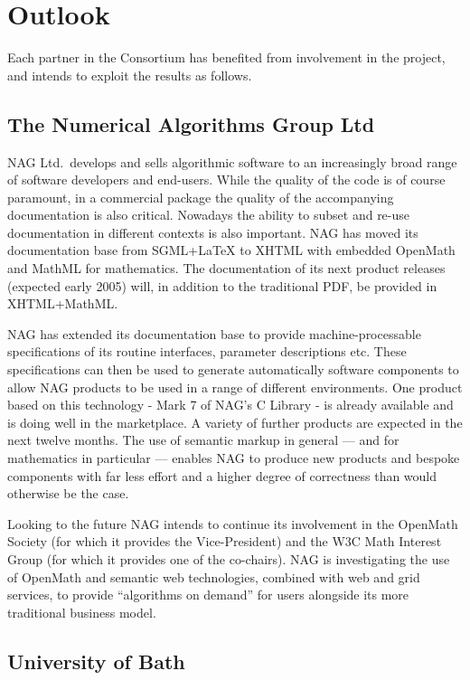 \chapter{Outlook}

Each partner in the Consortium has benefited from involvement in the project,
and intends to exploit the results as follows.


\section{The Numerical Algorithms Group Ltd}

NAG Ltd.~develops and sells algorithmic software to an increasingly
broad range of software developers and end-users.  While the quality of
the code is of course paramount, in a commercial package the quality of
the accompanying documentation is also critical.  Nowadays the ability
to subset and re-use documentation in different contexts is also
important.  NAG has moved its documentation base from SGML+LaTeX to
XHTML with embedded OpenMath and MathML for mathematics.  The
documentation of its next product releases (expected early 2005) will,
in addition to the traditional PDF, be provided in XHTML+MathML.

NAG has extended its documentation base to provide machine-processable
specifications of its routine interfaces, parameter descriptions etc.
These specifications can then be used to generate automatically software
components to allow NAG products to be used in a range of different
environments.  One product based on this technology - Mark 7 of NAG's C
Library - is already available and is doing well in the marketplace.
A variety of further products are expected in the next twelve months.
The use of semantic markup in general --- and for mathematics in
particular --- enables NAG to produce new products and bespoke
components with far less effort and a higher degree of correctness than
would otherwise be the case.

Looking to the future NAG intends to continue its involvement in the
OpenMath Society (for which it provides the Vice-President) and the W3C
Math Interest Group (for which it provides one of the co-chairs).  NAG
is investigating the use of OpenMath and semantic web technologies,
combined with web and grid services, to provide ``algorithms on demand''
for users alongside its more traditional business model.

\section{University of Bath}

